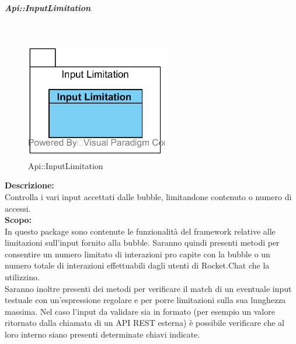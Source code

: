 \begin{samepage}
\subparagraph{Api\-::Input\-Limitation}\label{api-limiti}\mbox{}\\
\nopagebreak
\begin{figure}[H]
	\centering
	\includegraphics[height=5cm]{diagrammi_img/classi_e_package/api_limitinput.png}
	\caption{Api\-::Input\-Limitation}
\end{figure}
\end{samepage}
\textbf{Descrizione:}\\
Controlla i vari input accettati dalle bubble, limitandone contenuto o numero di accessi.\\
\textbf{Scopo:}\\
In questo package sono contenute le funzionalità del framework relative alle limitazioni sull'input fornito alla bubble. Saranno quindi presenti metodi per consentire un numero limitato di interazioni pro capite con la bubble o un numero totale di interazioni effettuabili dagli utenti di Rocket.Chat che la utilizzino.\\
Saranno inoltre presenti dei metodi per verificare il match di un eventuale input testuale con un'espressione regolare e per porre limitazioni sulla sua lunghezza massima. Nel caso l'input da validare sia in formato  (per esempio un valore ritornato dalla chiamata di un API REST esterna) è possibile verificare che al loro interno siano presenti determinate chiavi indicate.


